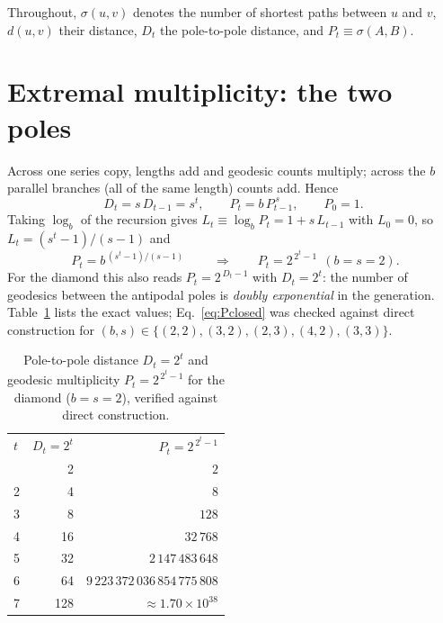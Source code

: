 \documentclass[aps,pre,onecolumn,superscriptaddress,floatfix]{revtex4-2}
\begin{document}
Throughout, $\sigma(u,v)$ denotes the number of shortest paths between $u$ and
$v$, $d(u,v)$ their distance, $D_t$ the pole-to-pole distance, and $P_t\equiv
\sigma(A,B)$.

\section{Extremal multiplicity: the two poles}
\label{sec:pole}

Across one series copy, lengths add and geodesic counts multiply; across the $b$
parallel branches (all of the same length) counts add. Hence
\begin{equation}
  D_t = s\,D_{t-1}=s^{t}, \qquad
  P_t = b\,P_{t-1}^{\,s}, \qquad P_0=1 .
  \label{eq:Prec}
\end{equation}
Taking $\log_b$ of the recursion gives $L_t\equiv\log_b P_t = 1+s\,L_{t-1}$ with
$L_0=0$, so $L_t=(s^{t}-1)/(s-1)$ and
\begin{equation}
  \boxed{\;P_t = b^{\,(s^{t}-1)/(s-1)}\;}
  \qquad\Longrightarrow\qquad
  P_t = 2^{\,2^{t}-1}\ \ (b=s=2).
  \label{eq:Pclosed}
\end{equation}
For the diamond this also reads $P_t = 2^{\,D_t-1}$ with $D_t=2^{t}$: the number
of geodesics between the antipodal poles is \emph{doubly exponential} in the
generation. Table~\ref{tab:pole} lists the exact values; Eq.~\eqref{eq:Pclosed}
was checked against direct construction for
$(b,s)\in\{(2,2),(3,2),(2,3),(4,2),(3,3)\}$.

\begin{table}[t]
  \caption{Pole-to-pole distance $D_t=2^{t}$ and geodesic multiplicity
  $P_t=2^{\,2^{t}-1}$ for the diamond ($b=s=2$), verified against direct
  construction.}
  \label{tab:pole}
  \begin{ruledtabular}
  \begin{tabular}{lrr}
    $t$ & $D_t=2^{t}$ & $P_t=2^{\,2^{t}-1}$ \\
    \colrule
    1 & 2   & $2$ \\
    2 & 4   & $8$ \\
    3 & 8   & $128$ \\
    4 & 16  & $32\,768$ \\
    5 & 32  & $2\,147\,483\,648$ \\
    6 & 64  & $9\,223\,372\,036\,854\,775\,808$ \\
    7 & 128 & $\approx 1.70\times10^{38}$ \\
  \end{tabular}
  \end{ruledtabular}
\end{table}
\end{document}
